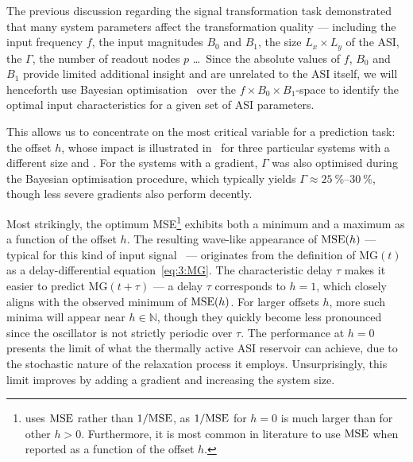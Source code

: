The previous discussion regarding the signal transformation task demonstrated that many system parameters affect the transformation quality --- including the input frequency $f$, the input magnitudes $B_0$ and $B_1$, the size $L_x \times L_y$ of the ASI, the  $\Gamma$, the number of readout nodes $p$ \dots\,
Since the absolute values of $f$, $B_0$ and $B_1$ provide limited additional insight and are unrelated to the ASI itself, we will henceforth use Bayesian optimisation~\cite{BayesOpt_Mockus1975} over the $f \times B_0 \times B_1$-space to identify the optimal input characteristics for a given set of ASI parameters. \par %
This allows us to concentrate on the most critical variable for a prediction task: the offset $h$, whose impact is illustrated in~ for three particular systems with a different size and .
For the systems with a gradient, $\Gamma$ was also optimised during the Bayesian optimisation procedure, which typically yields $\Gamma \approx \SIrange{25}{30}{\percent}$, though less severe gradients also perform decently. \par
Most strikingly, the optimum MSE\footnote{
	 uses $\mathrm{MSE}$ rather than $1/\mathrm{MSE}$, as $1/\mathrm{MSE}$ for $h=0$ is much larger than for other $h > 0$.
	Furthermore, it is most common in literature to use $\mathrm{MSE}$ when reported as a function of the offset $h$.
} exhibits both a minimum and a maximum as a function of the offset $h$.
The resulting wave-like appearance of $\mathrm{MSE}(h)$ --- typical for this kind of input signal~\cite{AdaptiveProgrammableRC,ForecastingNeuralODE} --- originates from the definition of $\mathrm{MG}(t)$ as a delay-differential equation~\eqref{eq:3:MG}.
The characteristic delay $\tau$ makes it easier to predict $\mathrm{MG}(t + \tau)$ --- a delay $\tau$ corresponds to $h=1$, which closely aligns with the observed minimum of $\mathrm{MSE}(h)$.
For larger offsets $h$, more such minima will appear near $h \in \mathbb{N}$, though they quickly become less pronounced since the oscillator is not strictly periodic over $\tau$.
The performance at $h=0$ presents the limit of what the thermally active ASI reservoir can achieve, due to the stochastic nature of the relaxation process it employs.
Unsurprisingly, this limit improves by adding a gradient and increasing the system size.

